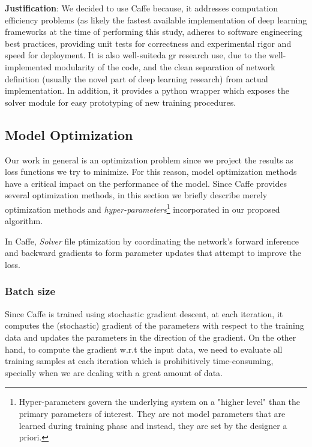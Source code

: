 \textbf{Justification}: We decided to use Caffe because, it addresses computation efficiency problems (as likely the fastest available implementation of deep learning frameworks at the time of performing this study, adheres to software engineering best practices, providing unit tests for correctness and experimental rigor and speed for deployment. It is also well-suiteda gr research use, due to the well-implemented modularity of the code, and the clean separation of network definition (usually the novel part of deep learning research) from actual implementation\cite{jia2014caffe}. In addition, it provides a python wrapper which exposes the solver module for easy prototyping of new training procedures. 

\subsection{Model Optimization}

Our work in general is an optimization problem since we project the results as loss functions we try to minimize. For this reason, model optimization methods have a critical impact on the performance of the model. Since Caffe provides several optimization methods, in this section we briefly describe merely optimization methods and \textit{hyper-parameters}\footnote{Hyper-parameters govern the underlying system on a "higher level" than the primary parameters of interest. They are not model parameters that are learned during training phase and instead, they are set by the designer a priori.} incorporated in our proposed algorithm.  

\indent In Caffe, \textit{Solver} file ptimization by coordinating the network's forward inference and backward gradients to form parameter updates that attempt to improve the loss. 

\subsubsection{Batch size}

Since Caffe is trained using stochastic gradient descent, at each iteration, it computes the (stochastic) gradient of the parameters with respect to the training data and updates the parameters in the direction of the gradient. On the other hand, to compute the gradient w.r.t the input data, we need to evaluate all training samples at each iteration which is prohibitively time-consuming, specially when we are dealing with a great amount of data. 

